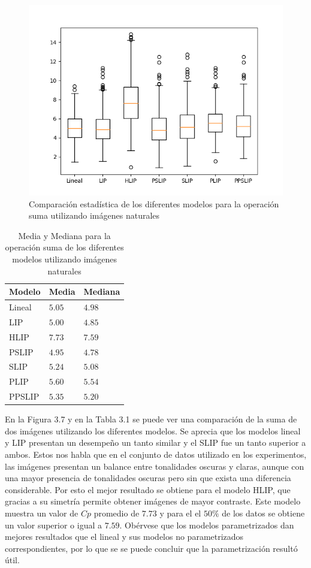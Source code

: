 \begin{figure}
	\begin{center}
		\includegraphics[width=10.0 cm]{images/graphics/sum_all.png}
		\caption{Comparaci\'on estad\'istica de los diferentes modelos para la operaci\'on suma utilizando im\'agenes naturales}
	\end{center}
\end{figure}

\begin{table}
	\begin{center}
		\begin{tabular}{|l|l|l|}
			\hline 
			Modelo & Media & Mediana\\
			\hline
			Lineal & $5.05$ & $4.98$\\
			\hline
			LIP & $5.00$ & $4.85$\\
			\hline
			HLIP & $7.73$ & $7.59$\\
			\hline
			PSLIP & $4.95$ & $4.78$\\
			\hline
			SLIP & $5.24$ & $5.08$\\
			\hline
			PLIP & $5.60$ & $5.54$\\
			\hline
			PPSLIP & $5.35$ & $5.20$\\
			\hline
		\end{tabular}
		\caption{Media y Mediana para la operaci\'on suma de los diferentes modelos utilizando im\'agenes naturales}
	\end{center}
\end{table}

En la Figura 3.7 y en la Tabla 3.1 se puede ver una comparaci\'on de la suma de dos im\'agenes utilizando los diferentes modelos. Se aprecia que los modelos lineal y LIP presentan un desempe\~no un tanto similar y el SLIP fue un tanto superior a ambos. Estos nos habla que en el conjunto de datos utilizado en los experimentos, las im\'agenes presentan un balance entre tonalidades oscuras y claras, aunque con una mayor presencia de tonalidades oscuras pero sin que exista una diferencia considerable. Por esto el mejor resultado se obtiene para el modelo HLIP, que gracias a su simetr\'ia permite obtener im\'agenes de mayor contraste. Este modelo muestra un valor de $Cp$ promedio de $7.73$ y para el el $50\%$ de los datos se obtiene un valor superior o igual a $7.59$. Ob\'ervese que los modelos parametrizados dan mejores resultados que el lineal y sus modelos no parametrizados correspondientes, por lo que se se puede concluir que la parametrizaci\'on result\'o \'util.  

